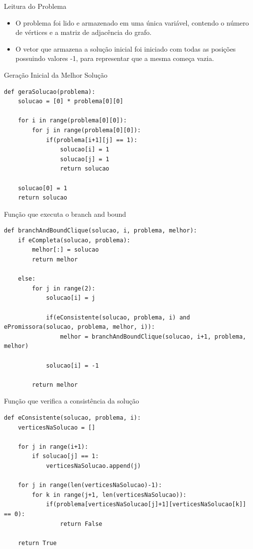 \documentclass[compress,aspectratio=169]{beamer}
\begin{document}
    \begin{frame}{Leitura do Problema}
        \begin{itemize}
            \item O problema foi lido e armazenado em uma única variável, contendo o número de vértices e a matriz de adjacência do grafo.
            \item O vetor que armazena a solução inicial foi iniciado com todas as posições possuindo valores -1, para representar que a mesma começa vazia.
        \end{itemize}
    \end{frame}

    \begin{frame}[fragile]{Geração Inicial da Melhor Solução}
        \begin{lstlisting}
def geraSolucao(problema):
    solucao = [0] * problema[0][0]

    for i in range(problema[0][0]):
        for j in range(problema[0][0]):
            if(problema[i+1][j] == 1):
                solucao[i] = 1
                solucao[j] = 1
                return solucao

    solucao[0] = 1
    return solucao
        \end{lstlisting}
    \end{frame}
    
    \begin{frame}[fragile]{Função que executa o branch and bound}
        \begin{lstlisting}
def branchAndBoundClique(solucao, i, problema, melhor):
    if eCompleta(solucao, problema):
        melhor[:] = solucao
        return melhor
    
    else:
        for j in range(2):
            solucao[i] = j
            
            if(eConsistente(solucao, problema, i) and ePromissora(solucao, problema, melhor, i)):
                melhor = branchAndBoundClique(solucao, i+1, problema, melhor)
            
            solucao[i] = -1
        
        return melhor
        \end{lstlisting}
    \end{frame}

    \begin{frame}[fragile]{Função que verifica a consistência da solução}
        \begin{lstlisting}
def eConsistente(solucao, problema, i):
    verticesNaSolucao = []
    
    for j in range(i+1):
        if solucao[j] == 1:
            verticesNaSolucao.append(j)

    for j in range(len(verticesNaSolucao)-1):
        for k in range(j+1, len(verticesNaSolucao)):
            if(problema[verticesNaSolucao[j]+1][verticesNaSolucao[k]] == 0):
                return False
            
    return True 
        \end{lstlisting}
    \end{frame}
\end{document}
